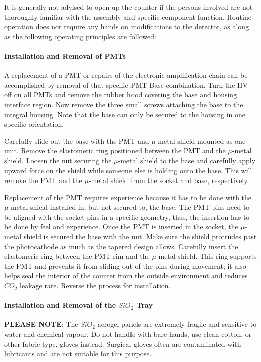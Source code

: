 It is generally not advised to open up the counter if the persons involved are
not thoroughly familiar with the assembly and specific component function.
Routine operation does not require any hands on modifications to the detector,
as along as the following operating principles are followed: 

\paragraph{Installation and Removal of PMTs}

A replacement of a PMT or repairs of the electronic amplification chain can   
be accomplished by removal of that specific PMT-Base combination. Turn the   
HV off on all PMTs and remove the rubber hood covering the base and housing 
interface region. Now remove the three small screws attaching the base to   
the integral housing. Note that the base can only be secured to the housing   
in one specific orientation. 

Carefully slide out the base with the PMT and $\mu$-metal shield mounted as one
unit. Remove the elastomeric ring positioned between the PMT and the   
$\mu$-metal shield. Loosen the nut securing the $\mu$-metal shield to the   
base and carefully apply upward force on the shield while someone else is   
holding onto the base. This will remove the PMT and the $\mu$-metal shield   
from the socket and base, respectively. 

Replacement of the PMT requires experience because it has to be done with the
$\mu$-metal shield installed in, but not secured to, the base. The PMT pins
need to be aligned with the socket pins in a specific geometry, thus, the
insertion has to be done by feel and experience. Once the PMT is inserted in
the socket, the $\mu$-metal shield is secured the base with the nut. Make sure
the shield protrudes past the photocathode as much as the tapered design
allows. Carefully insert the elastomeric ring between the PMT rim and the
$\mu$-metal shield. This ring supports the PMT and prevents it from sliding 
out of the pins during movement; it also helps seal the interior of the counter
from the outside environment and reduces $CO_2$ leakage rate. 
Reverse the process for installation.

\paragraph{Installation and Removal of the $SiO_2$ Tray}

{\bf PLEASE NOTE}: The $SiO_2$ aerogel panels are extremely fragile and sensitive to 
water and chemical vapour. Do not handle with bare hands, use clean cotton, or 
other fabric type, gloves instead. Surgical gloves often are contaminated with 
lubricants and are not suitable for this purpose. 

